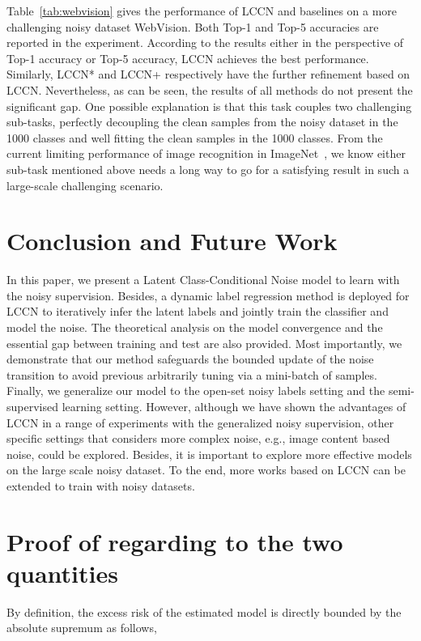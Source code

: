 \documentclass[journal]{IEEEtran}
\begin{document}
Table~\ref{tab:webvision} gives the performance of LCCN and baselines on a more challenging noisy dataset WebVision. Both Top-1 and Top-5 accuracies are reported in the experiment. According to the results either in the perspective of Top-1 accuracy or Top-5 accuracy, LCCN achieves the best performance. Similarly, LCCN* and LCCN+ respectively have the further refinement based on LCCN. Nevertheless, as can be seen, the results of all methods do not present the significant gap. One possible explanation is that this task couples two challenging sub-tasks, perfectly decoupling the clean samples from the noisy dataset in the 1000 classes and well fitting the clean samples in the 1000 classes. From the current limiting performance of image recognition in ImageNet~\cite{imagenet_cvpr09}, we know either sub-task mentioned above needs a long way to go for a satisfying result in such a large-scale challenging scenario.

\section{Conclusion and Future Work}
In this paper, we present a Latent Class-Conditional Noise model to learn with the noisy supervision. Besides, a dynamic label regression method is deployed for LCCN to iteratively infer the latent labels and jointly train the classifier and model the noise. The theoretical analysis on the model convergence and the essential gap between training and test are also provided. Most importantly, we demonstrate that our method safeguards the bounded update of the noise transition to avoid previous arbitrarily tuning via a mini-batch of samples. Finally, we generalize our model to the open-set noisy labels setting and the semi-supervised learning setting. However, although we have shown the advantages of LCCN in a range of experiments with the generalized noisy supervision, other specific settings that considers more complex noise, e.g., image content based noise, could be explored. Besides, it is important to explore more effective models on the large scale noisy dataset. To the end, more works based on LCCN can be extended to train with noisy datasets.


\appendices
\section{Proof of  regarding to the two quantities}
By definition, the excess risk of the estimated model  is directly bounded by the absolute supremum  as follows,
\end{document}
